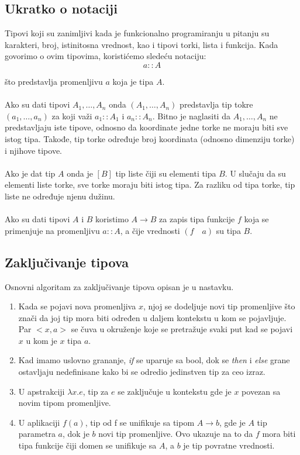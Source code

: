 \subsection{Ukratko o notaciji}
Tipovi koji su zanimljivi kada je funkcionalno programiranju u pitanju su karakteri, broj, istinitosna vrednost, kao i tipovi torki, lista i funkcija. Kada govorimo o ovim tipovima, koristićemo sledeću notaciju:
$$a::A$$

\noindent što predstavlja promenljivu $a$ koja je tipa $A$. 	
\\
\\ Ako su dati tipovi $A_1, \ldots, A_n$ onda $(A_1, \ldots, A_n)$ predstavlja tip tokre $(a_1, \ldots, a_n)$ za koji važi $a_1::A_1$ i $a_n::A_n$. Bitno je naglasiti da $A_1, \ldots, A_n$ ne predstavljaju iste tipove, odnosno da koordinate jedne torke ne moraju biti sve istog tipa. Takođe, tip torke određuje broj koordinata (odnosno dimenziju torke) i njihove tipove. 
\\
\\ Ako je dat tip $A$ onda je $[B]$ tip liste čiji su elementi tipa $B$. U slučaju da su elementi liste torke, sve torke moraju biti istog tipa. Za razliku od tipa torke, tip liste ne određuje njenu dužinu. 
\\
\\ Ako su dati tipovi $A$ i $B$ koristimo $A \longrightarrow B$ za zapis tipa funkcije $f$ koja se primenjuje na promenljivu $a::A$, a čije vrednosti $(f \quad a)$ su tipa $B$.


\fi 


\subsection{Zaključivanje tipova}

Osnovni algoritam za zaključivanje tipova opisan je u nastavku.

\begin{enumerate}
	\item Kada se pojavi nova promenljiva $x$, njoj se dodeljuje novi tip promenljive što znači da joj tip mora biti određen u daljem kontekstu u kom se pojavljuje. Par $<x, a>$ se čuva u okruženje koje se pretražuje svaki put kad se pojavi $x$ u kom je $x$ tipa $a$.
	
	\item Kad imamo uslovno grananje, \textit{if} se uparuje sa bool, dok se \textit{then} i \textit{else} grane ostavljaju nedefinisane kako bi se odredio jedinstven tip za ceo izraz.
	
	\item U apstrakciji $\lambda x.e$, tip za $e$ se zaključuje u kontekstu gde je $x$ povezan sa novim tipom promenljive.
	
	\item U aplikaciji $f(a)$, tip od f se unifikuje sa tipom $A \longrightarrow b$, gde je $A$ tip parametra $a$, dok je $b$ novi tip promenljive. Ovo ukazuje na to da $f$ mora biti tipa funkcije čiji domen se unifikuje sa $A$, a $b$ je tip povratne vrednosti.
\end{enumerate}



